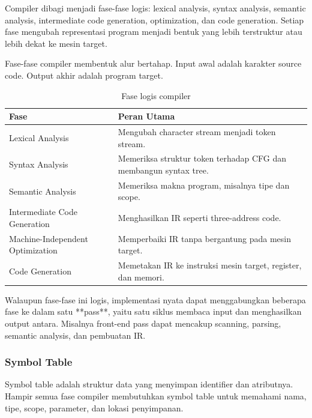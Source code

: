 \begin{jawab}
Compiler dibagi menjadi fase-fase logis: lexical analysis, syntax analysis, semantic analysis, intermediate code generation, optimization, dan code generation. Setiap fase mengubah representasi program menjadi bentuk yang lebih terstruktur atau lebih dekat ke mesin target.
\end{jawab}

Fase-fase compiler membentuk alur bertahap. Input awal adalah karakter source code. Output akhir adalah program target.

\begin{table}[H]
\centering
\begin{tabularx}{\textwidth}{|L{0.28\textwidth}|X|}
\hline
\textbf{Fase} & \textbf{Peran Utama} \\
\hline
Lexical Analysis & Mengubah character stream menjadi token stream. \\
\hline
Syntax Analysis & Memeriksa struktur token terhadap CFG dan membangun syntax tree. \\
\hline
Semantic Analysis & Memeriksa makna program, misalnya tipe dan scope. \\
\hline
Intermediate Code Generation & Menghasilkan IR seperti three-address code. \\
\hline
Machine-Independent Optimization & Memperbaiki IR tanpa bergantung pada mesin target. \\
\hline
Code Generation & Memetakan IR ke instruksi mesin target, register, dan memori. \\
\hline
\end{tabularx}
\caption{Fase logis compiler}
\label{tab:fase-compiler}
\end{table}

Walaupun fase-fase ini logis, implementasi nyata dapat menggabungkan beberapa fase ke dalam satu **pass**, yaitu satu siklus membaca input dan menghasilkan output antara. Misalnya front-end pass dapat mencakup scanning, parsing, semantic analysis, dan pembuatan IR.

\subsubsection{Symbol Table}

\begin{jawab}
Symbol table adalah struktur data yang menyimpan identifier dan atributnya. Hampir semua fase compiler membutuhkan symbol table untuk memahami nama, tipe, scope, parameter, dan lokasi penyimpanan.
\end{jawab}

